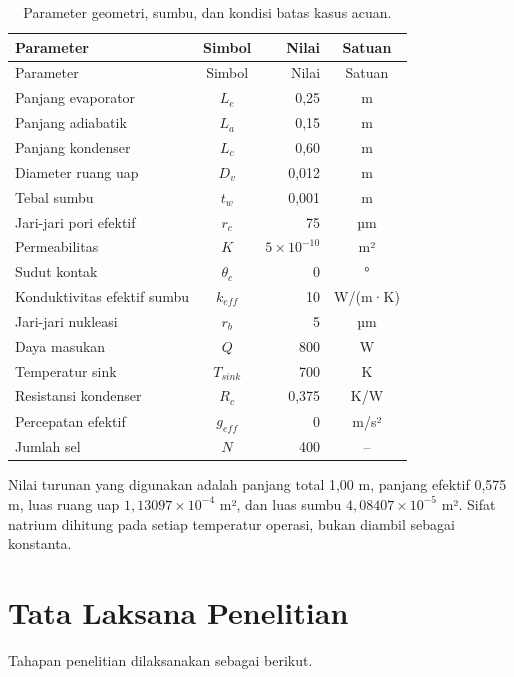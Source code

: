 \documentclass[
  12pt,a4paper,oneside]{report}
\begin{document}
\begin{longtable}[]{@{}lcrc@{}}
\caption{Parameter geometri, sumbu, dan kondisi batas kasus
acuan.}\tabularnewline
\toprule
Parameter & Simbol & Nilai & Satuan \\
\midrule
\endfirsthead
\toprule
Parameter & Simbol & Nilai & Satuan \\
\midrule
\endhead
Panjang evaporator & \(L_e\) & 0,25 & m \\
Panjang adiabatik & \(L_a\) & 0,15 & m \\
Panjang kondenser & \(L_c\) & 0,60 & m \\
Diameter ruang uap & \(D_v\) & 0,012 & m \\
Tebal sumbu & \(t_w\) & 0,001 & m \\
Jari-jari pori efektif & \(r_c\) & 75 & µm \\
Permeabilitas & \(K\) & \(5\times10^{-10}\) & m² \\
Sudut kontak & \(\theta_c\) & 0 & ° \\
Konduktivitas efektif sumbu & \(k_{eff}\) & 10 & W/(m·K) \\
Jari-jari nukleasi & \(r_b\) & 5 & µm \\
Daya masukan & \(Q\) & 800 & W \\
Temperatur sink & \(T_{sink}\) & 700 & K \\
Resistansi kondenser & \(R_c\) & 0,375 & K/W \\
Percepatan efektif & \(g_{eff}\) & 0 & m/s² \\
Jumlah sel & \(N\) & 400 & -- \\
\bottomrule
\end{longtable}

Nilai turunan yang digunakan adalah panjang total 1,00 m, panjang
efektif 0,575 m, luas ruang uap \(1{,}13097\times10^{-4}\) m², dan luas
sumbu \(4{,}08407\times10^{-5}\) m². Sifat natrium dihitung pada setiap
temperatur operasi, bukan diambil sebagai konstanta.

\hypertarget{tata-laksana-penelitian}{%
\section{Tata Laksana Penelitian}\label{tata-laksana-penelitian}}

Tahapan penelitian dilaksanakan sebagai berikut.
\end{document}
